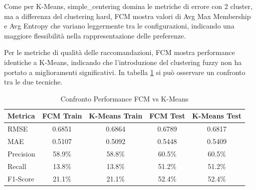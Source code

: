 Come per K-Means, simple\_centering domina le metriche di errore con 2 cluster, ma a differenza del clustering hard, FCM mostra valori di Avg Max Membership e Avg Entropy che variano leggermente tra le configurazioni, indicando una maggiore flessibilità nella rappresentazione delle preferenze.

Per le metriche di qualità delle raccomandazioni, FCM mostra performance identiche a K-Means, indicando che l'introduzione del clustering fuzzy non ha portato a miglioramenti significativi. In tabella \ref{tab:fcm_vs_kmeans} si può osservare un confronto tra le due tecniche.

\begin{table}[H]
  \centering
  \caption{Confronto Performance FCM vs K-Means}
  \label{tab:fcm_vs_kmeans}
  \begin{tabular}{|l|c|c|c|c|}
  \hline
  \textbf{Metrica} & \textbf{FCM Train} & \textbf{K-Means Train} & \textbf{FCM Test} & \textbf{K-Means Test} \\
  \hline
  RMSE & 0.6851 & 0.6864 & 0.6789 & 0.6817 \\
  MAE & 0.5107 & 0.5092 & 0.5448 & 0.5409 \\
  Precision & 58.9\% & 58.8\% & 60.5\% & 60.5\% \\
  Recall & 13.8\% & 13.8\% & 51.2\% & 51.2\% \\
  F1-Score & 21.1\% & 21.1\% & 52.4\% & 52.4\% \\
  \hline
  \end{tabular}
\end{table}
